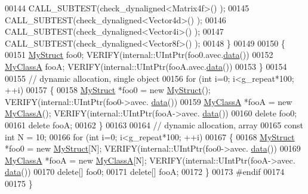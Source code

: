 \begin{DoxyCode}
00144     CALL\_SUBTEST(check\_dynaligned<Matrix4f>() );
00145     CALL\_SUBTEST(check\_dynaligned<Vector4d>() );
00146     CALL\_SUBTEST(check\_dynaligned<Vector4i>() );
00147     CALL\_SUBTEST(check\_dynaligned<Vector8f>() );
00148   \}
00149 
00150   \{
00151     \hyperlink{struct_my_struct}{MyStruct} foo0;  VERIFY(internal::UIntPtr(foo0.avec.\hyperlink{class_eigen_1_1_plain_object_base_ac25699535374b1854cf8494e44ad31b2}{data}())%
00152     \hyperlink{class_my_class_a}{MyClassA} fooA;  VERIFY(internal::UIntPtr(fooA.avec.\hyperlink{class_eigen_1_1_plain_object_base_ac25699535374b1854cf8494e44ad31b2}{data}())%
00153   \}
00154   
00155   \textcolor{comment}{// dynamic allocation, single object}
00156   \textcolor{keywordflow}{for} (\textcolor{keywordtype}{int} i=0; i<g\_repeat*100; ++i)
00157   \{
00158     \hyperlink{struct_my_struct}{MyStruct} *foo0 = \textcolor{keyword}{new} \hyperlink{struct_my_struct}{MyStruct}();  VERIFY(internal::UIntPtr(foo0->avec.
      \hyperlink{class_eigen_1_1_plain_object_base_ac25699535374b1854cf8494e44ad31b2}{data}())%
00159     \hyperlink{class_my_class_a}{MyClassA} *fooA = \textcolor{keyword}{new} \hyperlink{class_my_class_a}{MyClassA}();  VERIFY(internal::UIntPtr(fooA->avec.
      \hyperlink{class_eigen_1_1_plain_object_base_ac25699535374b1854cf8494e44ad31b2}{data}())%
00160     \textcolor{keyword}{delete} foo0;
00161     \textcolor{keyword}{delete} fooA;
00162   \}
00163 
00164   \textcolor{comment}{// dynamic allocation, array}
00165   \textcolor{keyword}{const} \textcolor{keywordtype}{int} N = 10;
00166   \textcolor{keywordflow}{for} (\textcolor{keywordtype}{int} i=0; i<g\_repeat*100; ++i)
00167   \{
00168     \hyperlink{struct_my_struct}{MyStruct} *foo0 = \textcolor{keyword}{new} \hyperlink{struct_my_struct}{MyStruct}[N];  VERIFY(internal::UIntPtr(foo0->avec.
      \hyperlink{class_eigen_1_1_plain_object_base_ac25699535374b1854cf8494e44ad31b2}{data}())%
00169     \hyperlink{class_my_class_a}{MyClassA} *fooA = \textcolor{keyword}{new} \hyperlink{class_my_class_a}{MyClassA}[N];  VERIFY(internal::UIntPtr(fooA->avec.
      \hyperlink{class_eigen_1_1_plain_object_base_ac25699535374b1854cf8494e44ad31b2}{data}())%
00170     \textcolor{keyword}{delete}[] foo0;
00171     \textcolor{keyword}{delete}[] fooA;
00172   \}
00173 \textcolor{preprocessor}{  #endif}
00174   
00175 \}
\end{DoxyCode}
